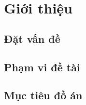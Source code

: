 

\chapter{Giới thiệu}


\section{Đặt vấn đề}




\afterpage{\clearpage}


\section{Phạm vi đề tài}


\section{Mục tiêu đồ án}


